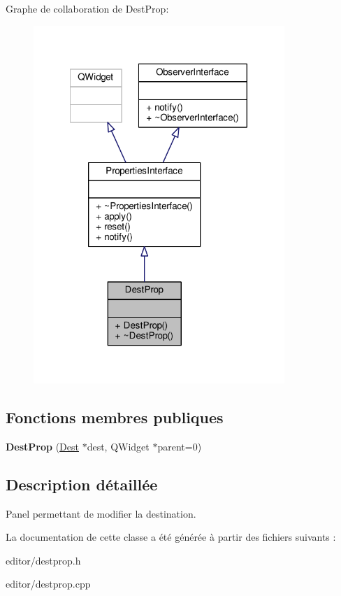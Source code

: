 Graphe de collaboration de Dest\+Prop\+:\nopagebreak
\begin{figure}[H]
\begin{center}
\leavevmode
\includegraphics[width=269pt]{d4/d2b/classDestProp__coll__graph}
\end{center}
\end{figure}
\subsection*{Fonctions membres publiques}
\begin{DoxyCompactItemize}
\item 
\hypertarget{classDestProp_accf41a3f4a376030696fca6daff74cff}{{\bfseries Dest\+Prop} (\hyperlink{classDest}{Dest} $\ast$dest, Q\+Widget $\ast$parent=0)}\label{classDestProp_accf41a3f4a376030696fca6daff74cff}

\end{DoxyCompactItemize}


\subsection{Description détaillée}
Panel permettant de modifier la destination. 

La documentation de cette classe a été générée à partir des fichiers suivants \+:\begin{DoxyCompactItemize}
\item 
editor/destprop.\+h\item 
editor/destprop.\+cpp\end{DoxyCompactItemize}
